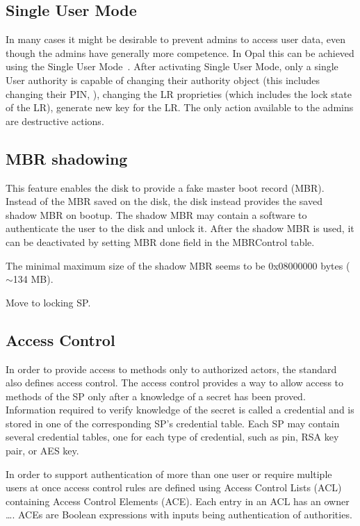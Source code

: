 \subsection{Single User Mode}

In many cases it might be desirable to prevent admins to access user data, even though the admins have generally more competence. In Opal this can be achieved using the Single User Mode~\cite{tcg-sum}. 
After activating Single User Mode, only a single User authority is capable of changing their authority object (this includes changing their PIN, ), changing the LR proprieties (which includes the lock state of the LR), generate new key for the LR.
The only action available to the admins are destructive actions.


\subsection{MBR shadowing}

This feature enables the disk to provide a fake master boot record (MBR). Instead of the MBR saved on the disk, the disk instead provides the saved shadow MBR on bootup. The shadow MBR may contain a software to authenticate the user to the disk and unlock it. After the shadow MBR is used, it can be deactivated by setting MBR done field in the MBRControl table.

The minimal maximum size of the shadow MBR seems to be 0x08000000 bytes ($\sim$134 MB).

Move to locking SP.


\subsection{Access Control}

In order to provide access to methods only to authorized actors, the standard also defines access control. The access control provides a way to allow access to methods of the SP only after a knowledge of a secret has been proved. Information required to verify knowledge of the secret is called a credential and is stored in one of the corresponding SP's credential table. Each SP may contain several credential tables, one for each type of credential, such as pin, RSA key pair, or AES key.

In order to support authentication of more than one user or require multiple users at once access control rules are defined using Access Control Lists (ACL) containing Access Control Elements (ACE). Each entry in an ACL has an owner \dots. ACEs are Boolean expressions with inputs being authentication of authorities.


